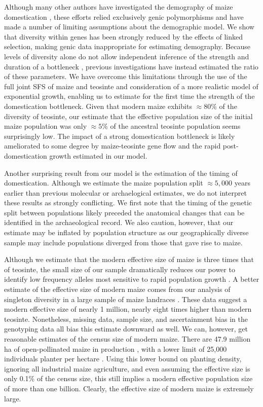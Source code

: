 \documentclass{pnastwo}
\begin{document}
\begin{article}
Although many other authors have investigated the demography of maize domestication \cite{eyre1998, tenaillon2004selection, wright2005}, these  efforts relied  exclusively genic polymorphisms and have made a number of limiting assumptions about the demographic model.  
We show that diversity within genes has been strongly reduced by the effects of linked selection, making genic data inappropriate for estimating demography.
Because levels of diversity alone do not allow independent inference of the strength and duration of a bottleneck \cite{tenaillon2004selection}, previous investigations have instead estimated the ratio of these parameters.  
We have overcome this limitations through the use of the full joint SFS of maize and teosinte and consideration of a more realistic model of exponential growth, enabling us to estimate for the first time the strength of the domestication bottleneck.  
Given that modern maize exhibits $\approx 80\%$ of the diversity of teosinte, our estimate that  the effective population size of the initial maize  population was only $\approx 5\%$ of the ancestral teosinte population seems surprisingly low.
The impact of a strong domestication bottleneck is likely ameliorated to some degree by  maize-teosinte gene flow and the rapid post-domestication growth estimated in our model.   

Another surprising result from our model is the estimation of the timing of domestication.
Although we estimate the maize population split $\approx 5,000$ years earlier than previous molecular \cite{matsuoka2002} or archaelogical \cite{piperno2009starch} estimates, we do not interpret these results as strongly conflicting.
We first note that the timing of the genetic split between populations likely preceded the anatomical changes that can be identified in the archaeological record. 
We also caution, however, that our estimate may be inflated by population structure as our geographically diverse sample may include populations diverged from those that gave rise to maize.

Although we estimate that the modern effective size of maize is three times that of teosinte, the small size of our sample dramatically reduces our power to identify low frequency alleles most sensitive to rapid population growth \cite{keinan2012}.  
A better estimate of the effective size of modern maize comes from our analysis of singleton diversity in a large sample of maize landraces \cite{Hearne2015}.
These data suggest a modern effective size of nearly 1 million, nearly eight times higher than modern teosinte.
Nonetheless, missing data, sample size, and ascertainment bias in the genotyping data all bias this estimate downward as well.
We can, however, get reasonable estimates of the census size of modern maize.
There are 47.9 million ha of open-pollinated maize in production \cite{cimmyt1999}, with a lower limit of 25,000 individuals planter per hectare \cite{baden2001culture}.
Using this lower bound on planting density, ignoring all industrial maize agriculture, and even assuming the effective size is only 0.1\% of the census size, this still implies a modern effective population size of more than one billion.
Clearly, the effective size of modern maize is extremely large.


\end{article}
\end{document}
